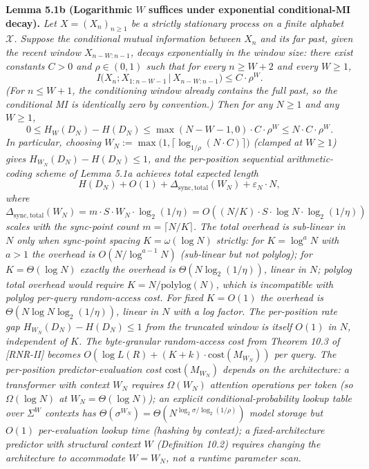 \documentclass[
]{article}
\begin{document}
\textbf{Lemma 5.1b (Logarithmic $W$ suffices under exponential
conditional-MI decay).} \emph{Let $X = (X_n)_{n \geq 1}$ be a
strictly stationary process on a finite alphabet $\mathcal{X}$.
Suppose the conditional mutual information between $X_n$ and its
far past, given the recent window $X_{n-W:n-1}$, decays
exponentially in the window size: there exist constants $C > 0$ and
$\rho \in (0, 1)$ such that for every $n \geq W + 2$ and every
$W \geq 1$,}
\[
I\bigl(X_n ; X_{1:n-W-1} \,\big|\, X_{n-W:n-1}\bigr) \leq C \cdot \rho^W.
\tag{5.8}
\]
\emph{(For $n \leq W + 1$, the conditioning window already contains
the full past, so the conditional MI is identically zero by
convention.) Then for any $N \geq 1$ and any $W \geq 1$,}
\[
0 \leq H_W(D_N) - H(D_N) \leq \max(N - W - 1, 0) \cdot C \cdot \rho^W \leq N \cdot C \cdot \rho^W.
\]
\emph{In particular, choosing
$W_N := \max\bigl(1, \lceil \log_{1/\rho}(N \cdot C) \rceil\bigr)$
(clamped at $W \geq 1$) gives $H_{W_N}(D_N) - H(D_N) \leq 1$, and
the per-position sequential arithmetic-coding scheme of Lemma 5.1a
achieves total expected length}
\[
H(D_N) + O(1) + \Delta_{\mathrm{sync,total}}(W_N) + \varepsilon_N \cdot N,
\]
\emph{where $\Delta_{\mathrm{sync,total}}(W_N) = m \cdot S \cdot W_N
\cdot \log_2(1/\eta) = O((N/K) \cdot S \cdot \log N \cdot \log_2(1/\eta))$
scales with the sync-point count $m = \lceil N/K \rceil$. The total
overhead is sub-linear in $N$ only when sync-point spacing
$K = \omega(\log N)$ strictly: for $K = \log^a N$ with $a > 1$ the
overhead is $O(N/\log^{a-1} N)$ (sub-linear but \emph{not} polylog);
for $K = \Theta(\log N)$ exactly the overhead is $\Theta(N
\log_2(1/\eta))$, linear in $N$; polylog total overhead would
require $K = N/\mathrm{polylog}(N)$, which is incompatible with
polylog per-query random-access cost. For fixed $K = O(1)$ the
overhead is $\Theta(N \log N \log_2(1/\eta))$, linear in $N$ with
a log factor.
The per-position rate gap $H_{W_N}(D_N) - H(D_N) \leq 1$ from the
truncated window is itself $O(1)$ in $N$, independent of $K$.
The byte-granular random-access cost from Theorem 10.3 of [RNR-II] becomes
$O(\log L(R) + (K + k) \cdot \mathrm{cost}(M_{W_N}))$ per query. The per-position
predictor-evaluation cost $\mathrm{cost}(M_{W_N})$ depends on the
architecture: a transformer with context $W_N$ requires
$\Omega(W_N)$ attention operations per token (so $\Omega(\log N)$ at
$W_N = \Theta(\log N)$); an explicit conditional-probability lookup
table over $\Sigma^W$ contexts has $\Theta(\sigma^{W_N}) =
\Theta(N^{\log_2 \sigma / \log_2(1/\rho)})$ \emph{model storage} but
$O(1)$ per-evaluation lookup time (hashing by context);
a fixed-architecture predictor with structural context $W$
(Definition 10.2) requires changing the architecture to accommodate
$W = W_N$, not a runtime parameter scan.}
\end{document}
